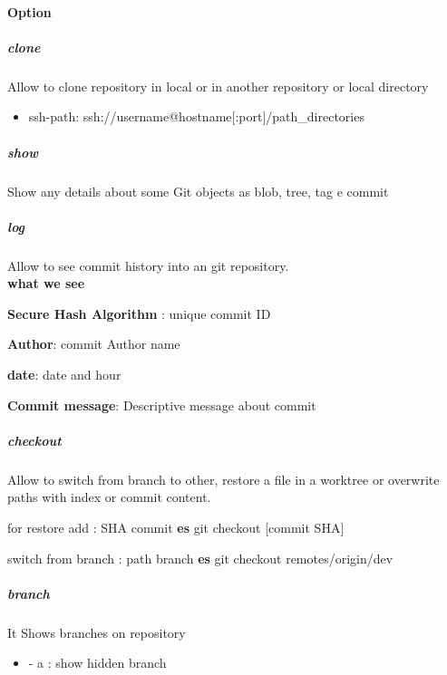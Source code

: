 \documentclass{article}
\begin{document}
                    \paragraph{Option}
                        \subparagraph{clone}
                            Allow to clone repository in local or in another repository or local directory
                            \begin{itemize}
                                \item ssh-path: ssh://username@hostname[:port]/path\_directories
                            \end{itemize}
                        \subparagraph{show}
                            Show any details about some Git objects as blob, tree, tag e commit
                        \subparagraph{log}
                                Allow to see commit history into an git repository. \\
                                \textbf{what we see}
                                \begin{description}
                                    \item \textbf{Secure Hash Algorithm} : unique commit ID 
                                    \item \textbf{Author}: commit Author name
                                    \item \textbf{date}: date and hour 
                                    \item \textbf{Commit message}: Descriptive message about commit 
                                \end{description}
                        \subparagraph{checkout}
                                Allow to switch from branch to other, restore a file in a worktree or overwrite paths with index or commit content. 
                                \begin{description}
                                    \item for restore add : SHA commit \textbf{es} git checkout [commit SHA] 
                                    \item switch from branch : path branch \textbf{es} git checkout remotes/origin/dev
                                \end{description}
                        \subparagraph{branch}
                                It Shows branches on repository
                                \begin{itemize}
                                    \item - a : show hidden branch
                                \end{itemize}
\end{document}
